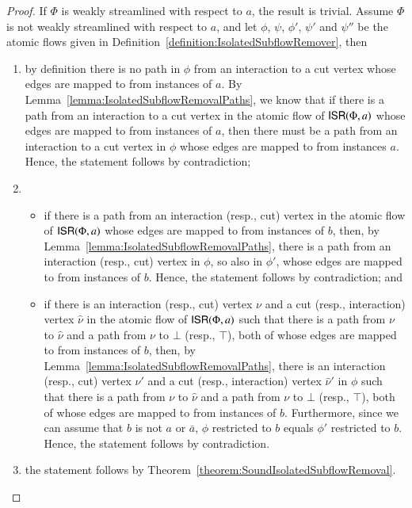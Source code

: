 \begin{proof}
If $\Phi$ is weakly streamlined with respect to $a$, the result is trivial. Assume $\Phi$ is not weakly streamlined with respect to $a$, and let $\phi$, $\psi$, $\phi'$, $\psi'$ and $\psi''$ be the atomic flows given in Definition~\ref{definition:IsolatedSubflowRemover}, then
\begin{enumerate}
\item by definition there is no path in $\phi$ from an interaction to a cut vertex whose edges are mapped to from instances of $a$. By Lemma~\vref{lemma:IsolatedSubflowRemovalPaths}, we know that if there is a path from an interaction to a cut vertex in the atomic flow of $\mathsf{ISR}(\Phi,a)$ whose edges are mapped to from instances of $a$, then there must be a path from an interaction to a cut vertex in $\phi$ whose edges are mapped to from instances $a$. Hence, the statement follows by contradiction;
\item
\begin{itemize}
 \item if there is a path from an interaction (resp., cut) vertex in the atomic flow of $\mathsf{ISR}(\Phi,a)$ whose edges are mapped to from instances of $b$, then, by \newline Lemma~\vref{lemma:IsolatedSubflowRemovalPaths}, there is a path from an interaction (resp., cut) vertex in $\phi$, so also in $\phi'$, whose edges are mapped to from instances of $b$. Hence, the statement follows by contradiction; and
 \item if there is an interaction (resp., cut) vertex $\nu$ and a cut (resp., interaction) vertex $\hat\nu$ in the atomic flow of $\mathsf{ISR}(\Phi,a)$ such that there is a path from $\nu$ to $\hat\nu$ and a path from $\nu$ to $\bot$ (resp., $\top$), both of whose edges are mapped to from instances of $b$, then, by Lemma~\vref{lemma:IsolatedSubflowRemovalPaths}, there is an interaction (resp., cut) vertex $\nu'$ and a cut (resp., interaction) vertex $\hat\nu'$ in $\phi$ such that there is a path from $\nu$ to $\hat\nu$ and a path from $\nu$ to $\bot$ (resp., $\top$), both of whose edges are mapped to from instances of $b$. Furthermore, since we can assume that $b$ is not $a$ or $\bar a$, $\phi$ restricted to $b$ equals $\phi'$ restricted to $b$. Hence, the statement follows by contradiction.
\end{itemize}
\item the statement follows by Theorem~\vref{theorem:SoundIsolatedSubflowRemoval}.
\end{enumerate}
\end{proof}

